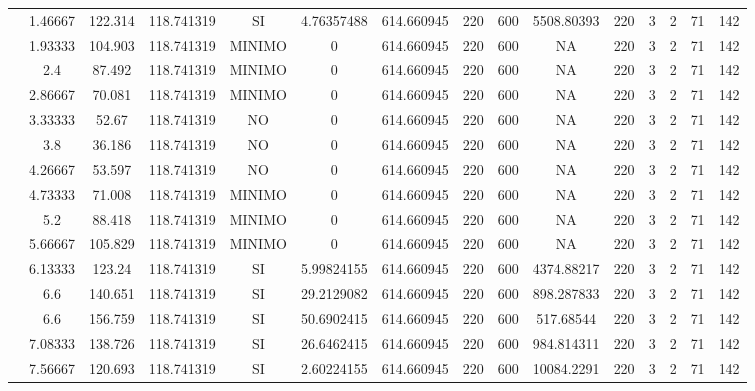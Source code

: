\begin{table}[H]
{\begin{tabular}{|c|c|c|c|c|c|c|c|c|c|c|c|c|c|c|}
\cline{2-15}    & 1.46667 & 122.314 & 118.741319 & SI  & 4.76357488 & 614.660945 & 220 & 600 & 5508.80393 & 220 & 3   & 2   & 71  & 142 \bigstrut\\
\cline{2-15}    & 1.93333 & 104.903 & 118.741319 & MINIMO & 0   & 614.660945 & 220 & 600 & NA  & 220 & 3   & 2   & 71  & 142 \bigstrut\\
\cline{2-15}    & 2.4 & 87.492 & 118.741319 & MINIMO & 0   & 614.660945 & 220 & 600 & NA  & 220 & 3   & 2   & 71  & 142 \bigstrut\\
\cline{2-15}    & 2.86667 & 70.081 & 118.741319 & MINIMO & 0   & 614.660945 & 220 & 600 & NA  & 220 & 3   & 2   & 71  & 142 \bigstrut\\
\cline{2-15}    & 3.33333 & 52.67 & 118.741319 & NO  & 0   & 614.660945 & 220 & 600 & NA  & 220 & 3   & 2   & 71  & 142 \bigstrut\\
\cline{2-15}    & 3.8 & 36.186 & 118.741319 & NO  & 0   & 614.660945 & 220 & 600 & NA  & 220 & 3   & 2   & 71  & 142 \bigstrut\\
\cline{2-15}    & 4.26667 & 53.597 & 118.741319 & NO  & 0   & 614.660945 & 220 & 600 & NA  & 220 & 3   & 2   & 71  & 142 \bigstrut\\
\cline{2-15}    & 4.73333 & 71.008 & 118.741319 & MINIMO & 0   & 614.660945 & 220 & 600 & NA  & 220 & 3   & 2   & 71  & 142 \bigstrut\\
\cline{2-15}    & 5.2 & 88.418 & 118.741319 & MINIMO & 0   & 614.660945 & 220 & 600 & NA  & 220 & 3   & 2   & 71  & 142 \bigstrut\\
\cline{2-15}    & 5.66667 & 105.829 & 118.741319 & MINIMO & 0   & 614.660945 & 220 & 600 & NA  & 220 & 3   & 2   & 71  & 142 \bigstrut\\
\cline{2-15}    & 6.13333 & 123.24 & 118.741319 & SI  & 5.99824155 & 614.660945 & 220 & 600 & 4374.88217 & 220 & 3   & 2   & 71  & 142 \bigstrut\\
\cline{2-15}    & 6.6 & 140.651 & 118.741319 & SI  & 29.2129082 & 614.660945 & 220 & 600 & 898.287833 & 220 & 3   & 2   & 71  & 142 \bigstrut\\
\cline{2-15}    & 6.6 & 156.759 & 118.741319 & SI  & 50.6902415 & 614.660945 & 220 & 600 & 517.68544 & 220 & 3   & 2   & 71  & 142 \bigstrut\\
\cline{2-15}    & 7.08333 & 138.726 & 118.741319 & SI  & 26.6462415 & 614.660945 & 220 & 600 & 984.814311 & 220 & 3   & 2   & 71  & 142 \bigstrut\\
\cline{2-15}    & 7.56667 & 120.693 & 118.741319 & SI  & 2.60224155 & 614.660945 & 220 & 600 & 10084.2291 & 220 & 3   & 2   & 71  & 142 \bigstrut\\

\end{tabular}}
\end{table}
